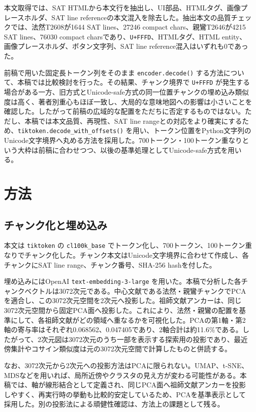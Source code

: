 \documentclass[uplatex,dvipdfmx,11pt,a4paper]{jsarticle}
\begin{document}
本文取得では、SAT HTMLから本文行を抽出し、UI部品、HTMLタグ、画像プレースホルダ、SAT line referenceの本文混入を除去した。抽出本文の品質チェックでは、法然T2608が1644 SAT lines、27246 compact chars、親鸞T2646が4215 SAT lines、76030 compact charsであり、\texttt{U+FFFD}、HTMLタグ、HTML entity、画像プレースホルダ、ボタン文字列、SAT line reference混入はいずれも0であった。

前稿で用いた固定長トークン列をそのまま \texttt{encoder.decode()} する方法について、本稿では比較検討を行った。その結果、チャンク境界で \texttt{U+FFFD} が発生する場合がある一方、旧方式とUnicode-safe方式の同一位置チャンクの埋め込み類似度は高く、著者別重心もほぼ一致し、大局的な意味地図への影響は小さいことを確認した。したがって前稿の広域的な配置をただちに否定するものではない。ただし、本稿では本文品質、再現性、SAT line rangeとの対応をより確実にするため、\texttt{tiktoken.decode\_with\_offsets()} を用い、トークン位置をPython文字列のUnicode文字境界へ丸める方法を採用した。700トークン・100トークン重なりという大枠は前稿に合わせつつ、以後の基準処理としてUnicode-safe方式を用いる。

\section{方法}

\subsection{チャンク化と埋め込み}

本文は \texttt{tiktoken} の \texttt{cl100k\_base} でトークン化し、700トークン、100トークン重なりでチャンク化した。チャンク本文はUnicode文字境界に合わせて作成し、各チャンクにSAT line range、チャンク番号、SHA-256 hashを付した。

埋め込みにはOpenAI \texttt{text-embedding-3-large} を用いた。本稿で分析した各チャンクベクトルは3072次元である。中心文献である法然・親鸞チャンクでPCAを適合し、この3072次元空間を2次元へ投影した。祖師文献アンカーは、同じ3072次元空間から固定PCA面へ投影した。これにより、法然・親鸞の配置を基準にして、各祖師文献がどの領域へ重なるかを可視化した。PCAの第1軸・第2軸の寄与率はそれぞれ0.068562、0.047405であり、2軸合計は約11.6\%である。したがって、2次元図は3072次元のうち一部を表示する探索用の投影であり、最近傍集計やコサイン類似度は元の3072次元空間で計算したものと併読する。

なお、3072次元から2次元への投影方法はPCAに限られない。UMAP、t-SNE、MDSなどを用いれば、局所近傍やクラスタの見え方が変わる可能性がある。本稿では、軸が線形結合として定義され、同じPCA面へ祖師文献アンカーを投影しやすく、再実行時の挙動も比較的安定しているため、PCAを基準表示として採用した。別の投影法による頑健性確認は、方法上の課題として残る。
\end{document}
